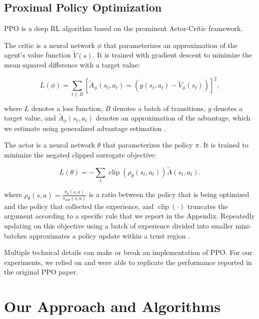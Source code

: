 \documentclass[letterpaper]{article} %
\DeclareMathOperator*{\clip}{clip}
\begin{document}
\subsection{Proximal Policy Optimization}
\label{sec:problem_proximal}

PPO \cite{schulman2017proximal} is a deep RL algorithm based on the prominent Actor-Critic framework.

The critic is a neural network $\phi$ that parameterizes an approximation of the agent's value function $\tilde{V}(s)$. It is trained with gradient descent to minimize the mean squared difference with a target value:

\begin{equation}\label{eq:loss_ppo_critic}
    L(\phi) = \sum_{t \in B} \left[\tilde{A}_\phi(s_t, a_t) = (y(s_t, a_t) - \tilde{V}_\phi(s_t)) \right]^2,
\end{equation}

\noindent where $L$ denotes a loss function, $B$ denotes a batch of transitions, $y$ denotes a target value, and $\tilde{A}_\phi(s_t, a_t)$ denotes an approximation of the advantage, which we estimate using generalized advantage estimation \cite{schulman2015high}.

The actor is a neural network $\theta$ that parameterizes the policy $\pi$. It is trained to minimize the negated clipped surrogate objective:

\begin{equation}\label{eq:loss_ppo_actor_short}
    L(\theta) = - \sum_t \clip(\rho_\theta(s_t, a_t)) \tilde{A}(s_t, a_t).
\end{equation}

\noindent where $\rho_\theta(s, a) = \frac{\pi_\theta(s, a)}{\pi_{old}(s, a)}$ is a ratio between the policy that is being optimized and the policy that collected the experience, and $\clip(\cdot)$ truncates the argument according to a specific rule that we report in the Appendix. Repeatedly updating on this objective using a batch of experience divided into smaller mini-batches approximates a policy update within a trust region \cite{schulman2015trust}.


Multiple technical details can make or break an implementation of PPO. For our experiments, we relied on \cite{shengyi2022the37implementation} and were able to replicate the performance reported in the original PPO paper.



\section{Our Approach and Algorithms}
\label{sec:our}
\end{document}
